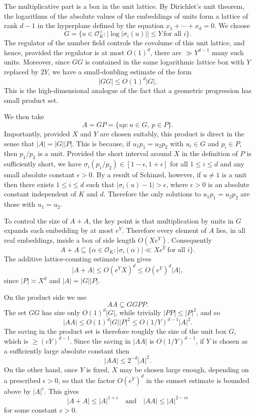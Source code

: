 \documentclass{amsart}
\numberwithin{equation}{section}
\newcommand{\abs}[1]{\mathopen{}\left| #1\mathclose{}\right|}
\newcommand{\Abs}[1]{\lvert #1\rvert}
\begin{document}
The multiplicative part is a box in the unit lattice.  By Dirichlet's unit
theorem, the logarithms of the absolute values of the embeddings of units form a
lattice of rank \(d-1\) in the hyperplane defined by the equation $x_1+\cdots+x_d=0$. We choose
\[
        G=\{u\in\mathcal O_K^\times:
        \abs{\log\abs{\sigma_i(u)}}\leq Y\ \text{for all }i\}.
\]
The regulator of the number field controls the covolume of this unit lattice, and hence, provided the regulator is at most $O(1)^d$, there are $\gg Y^{d-1}$ many such units.  Moreover, since \(GG\) is contained in the same logarithmic lattice
box with \(Y\) replaced by \(2Y\), we have a small-doubling estimate of the form
\[
        \abs{GG}\leq O(1)^d\abs{G}.
\]
This is the high-dimensional analogue of the fact that a geometric progression
has small product set.

We then take
\[
        A=GP=\{up:u\in G,\ p\in P\}.
\]
Importantly, provided $X$ and $Y$ are chosen suitably, this product is direct in the sense that $\abs{A}=\abs{G}\abs{P}$. This is because, if $u_1p_1=u_2p_2$ with $u_i\in G$ and $p_i\in P$, then $p_1/p_2$ is a unit. Provided the short interval around $X$ in the definition of $P$ is sufficiently short, we have $\sigma_i(p_1/p_2)\in [1-\epsilon,1+\epsilon]$ for all $1\leq i\leq d$ and any small absolute constant $\epsilon>0$. By a result of Schinzel, however, if $u\neq1$ is a unit then there exists $1\leq i\leq d$ such that $\Abs{\sigma_i(u)-1}>\epsilon$, where $\epsilon>0$ is an absolute constant independent of $K$ and $d$. Therefore the only solutions to $u_1p_1=u_2p_2$ are those with $u_1=u_2$. 

To control the size of $A+A$, the key point is that multiplication by units in \(G\) expands each embedding by
at most \(e^Y\).  Therefore every element of \(A\) lies, in all real embeddings,
inside a box of side length \(O(Xe^Y)\).  Consequently
\[
        A+A\subseteq
        \{\alpha\in\mathcal O_K:
        \abs{\sigma_i(\alpha)}\ll Xe^Y\ \text{for all }i\}.
\]
The additive lattice-counting estimate then gives
\[
        \abs{A+A}\leq O(e^YX)^d\leq O(e^Y)^d\abs{A},
\]
since \(\abs{P}\asymp X^d\) and \(\abs{A}=\abs{G}\abs{P}\).

On the product side we use
\[
        AA\subseteq GGP P.
\]
The set \(GG\) has size only \(O(1)^d\abs{G}\), while trivially $\abs{PP}\leq \abs{P}^2$, and so
\[
        \abs{AA}
        \leq O(1)^d \abs{G}\abs{P}^{2}
        \leq O(1/Y)^{d-1}\abs{A}^2.
\]
The saving in the product set is therefore roughly the size of the unit box
\(G\), which is $\geq (cY)^{d-1}$. Since the saving in $\abs{AA}$ is $O(1/Y)^{d-1}$, if $Y$ is chosen as a sufficiently large absolute constant then
\[
        \abs{AA}\leq 2^{-d}\abs{A}^{2}.
\]
On the other hand, once $Y$ is fixed, \(X\) may be chosen large enough, depending on a prescribed \(\epsilon>0\), so
that the factor \(O(e^Y)^d\) in the sumset estimate is bounded above by 
\(\abs{A}^{\epsilon}\).  This gives
\[
        \abs{A+A}\leq \abs{A}^{1+\epsilon}\quad\textrm{and}\quad
        \abs{AA}\leq \abs{A}^{2-c\epsilon}
\]
for some constant $c>0$. 
\end{document}
